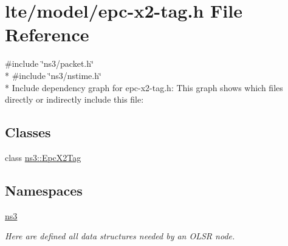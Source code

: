 \hypertarget{epc-x2-tag_8h}{}\section{lte/model/epc-\/x2-\/tag.h File Reference}
\label{epc-x2-tag_8h}
{\ttfamily \#include \char`\"{}ns3/packet.\+h\char`\"{}}\\*
{\ttfamily \#include \char`\"{}ns3/nstime.\+h\char`\"{}}\\*
Include dependency graph for epc-\/x2-\/tag.h\+:
This graph shows which files directly or indirectly include this file\+:
\subsection*{Classes}
\begin{DoxyCompactItemize}
\item 
class \hyperlink{classns3_1_1EpcX2Tag}{ns3\+::\+Epc\+X2\+Tag}
\end{DoxyCompactItemize}
\subsection*{Namespaces}
\begin{DoxyCompactItemize}
\item 
 \hyperlink{namespacens3}{ns3}
\begin{DoxyCompactList}\small\item\em Here are defined all data structures needed by an O\+L\+SR node. \end{DoxyCompactList}\end{DoxyCompactItemize}
